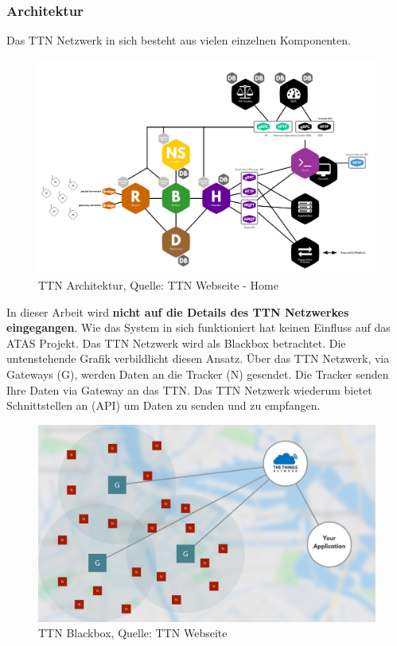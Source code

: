 \documentclass[11pt,english,german]{report}
\theoremstyle{definition}
\begin{document}
\subsubsection{Architektur}
Das TTN Netzwerk in sich besteht aus vielen einzelnen Komponenten.
\begin{figure}[H]
	\centering
	\includegraphics[width=\textwidth]{img/ttn/ttn_architecture.png}
	\caption[TTN Architektur]
	{TTN Architektur, Quelle: TTN Webseite - Home \cite{ttnhome}}
\end{figure}

\newpage
\noindent
In dieser Arbeit wird \textbf{nicht auf die Details des TTN Netzwerkes eingegangen}. Wie das System in sich funktioniert hat keinen Einfluss auf das ATAS Projekt. Das TTN Netzwerk wird als Blackbox betrachtet. Die untenstehende Grafik verbildlicht diesen Ansatz. Über das TTN Netzwerk, via Gateways (G), werden Daten an die Tracker (N) gesendet. Die Tracker senden Ihre Daten via Gateway an das TTN. Das TTN Netzwerk wiederum bietet Schnittstellen an (API) um Daten zu senden und zu empfangen.

\begin{figure}[H]
	\centering
	\includegraphics[width=\textwidth]{img/ttn/ttn-overview.jpg}
	\caption[TTN Blackbox]
	{TTN Blackbox, Quelle: TTN Webseite \cite{ttnwiki}}
\end{figure}
\noindent
\end{document}
